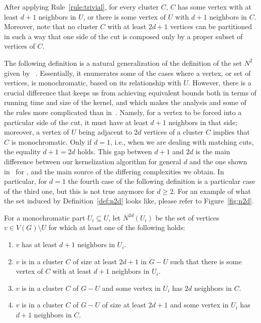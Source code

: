 After applying Rule~\ref{rule:trivial}, for every cluster $C$, $C$  has some vertex with at least $d+1$ neighbors in $U$, or there is some vertex of $U$ with $d+1$ neighbors in $C$.
Moreover, note that no cluster $C$ with at least $2d+1$ vertices can be partitioned in such a way that one side of the cut is composed only by a proper subset of vertices of $C$.

The following definition is a natural generalization of the definition of the set $N^2$ given by ~\cite{matching_cut_ipec}.
Essentially, it enumerates some of the cases where a vertex, or set of vertices, is monochromatic, based on its relationship with $U$.
However, there is a crucial difference that keeps us from achieving equivalent bounds both in terms of running time and size of the kernel, and which makes the analysis and some of the rules more complicated than in~\citep{matching_cut_ipec}.
Namely, for a vertex to be forced into a particular side of the cut, it must have at least $d+1$ neighbors in that side; moreover, a vertex of $U$ being adjacent to $2d$ vertices of a cluster $C$ implies that $C$ is monochromatic.
Only if $d=1$, i.e., when we are dealing with matching cuts, the equality $d+1 = 2d$ holds.
This gap between $d+1$ and $2d$ is the main difference between our kernelization algorithm for general $d$ and the one shown in~\citep{matching_cut_ipec} for , and the main source of the differing complexities we obtain. In particular, for $d=1$ the fourth case of the following definition is a particular case of the third one, but this is not true anymore for $d \geq 2$.
For an example of what the set induced by Definition~\ref{def:n2d} looks like, please refer to Figure~\ref{fig:n2d}.

\begin{definition}
    \label{def:n2d}
    For a monochromatic part $U_i \subseteq U$, let $N^{2d}(U_i)$ be the set of vertices $v \in V(G) \setminus U$ for which at least one of the following holds:

    \begin{enumerate}
        \item $v$ has at least $d+1$ neighbors in $U_i$.
        \item $v$ is in a cluster $C$ of size at least $2d+1$ in $G - U$ such that there is some vertex of $C$ with at least $d+1$ neighbors in $U_i$.
        \item $v$ is in a cluster $C$ of $G - U$ and some vertex in $U_i$ has $2d$ neighbors in $C$.
        \item $v$ is in a cluster $C$ of $G - U$ of size at least $2d+1$ and some vertex in $U_i$ has $d+1$ neighbors in $C$.
    \end{enumerate}
\end{definition}


